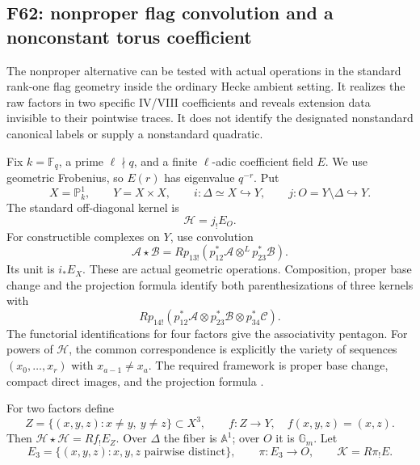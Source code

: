\documentclass[11pt,a4paper]{article}
\newcommand{\fid}[1]{\textsf{#1}}\newcommand{\gate}[1]{\textsf{#1}}
\theoremstyle{named}\newtheorem{finding}{Finding}[section]
\theoremstyle{definition}\newtheorem{definition}[finding]{Definition}
\theoremstyle{remark}\newtheorem{remark}[finding]{Remark}
\begin{document}
\subsection{\fid{F62}: nonproper flag convolution and a nonconstant torus coefficient}
\label{sec:nonpropertorus}

The nonproper alternative can be tested with actual operations in
the standard rank-one flag geometry inside the ordinary Hecke
ambient setting. It realizes the raw factors in two specific
IV/VIII coefficients and reveals extension data invisible to
their pointwise traces. It does not identify the designated
nonstandard canonical labels or supply a nonstandard quadratic.

Fix \(k=\mathbb F_q\), a prime \(\ell\nmid q\), and a finite
\(\ell\)-adic coefficient field \(E\).
We use geometric Frobenius, so \(E(r)\) has eigenvalue \(q^{-r}\).
Put
\[
 X=\mathbb P^1_k,\qquad Y=X\times X,\qquad
 i:\Delta\simeq X\hookrightarrow Y,\qquad
 j:O=Y\setminus\Delta\hookrightarrow Y.
\]
The standard off-diagonal kernel is
\[
                         \mathcal H=j_!E_O.
\]
For constructible complexes on \(Y\), use convolution
\begin{equation}\label{eq:flagkernelconvolution}
 \mathcal A\star\mathcal B
   =Rp_{13!}(p_{12}^*\mathcal A\otimes^L p_{23}^*\mathcal B).
\end{equation}
Its unit is \(i_*E_X\).
These are actual geometric operations. Composition, proper base
change and the projection formula identify both parenthesizations
of three kernels with
\[
 Rp_{14!}(p_{12}^*\mathcal A\otimes
          p_{23}^*\mathcal B\otimes p_{34}^*\mathcal C).
\]
The functorial identifications for four factors give the
associativity pentagon. For powers of \(\mathcal H\), the common
correspondence is explicitly the variety of sequences
\((x_0,\ldots,x_r)\) with \(x_{a-1}\ne x_a\).
The required framework is proper base change, compact direct
images, and the projection formula
\cite[Theorem~17.10, pp.~116--117; Proposition~18.4,
pp.~121--122; Proposition~22.5, pp.~136--137]{Milne}.

For two factors define
\[
 Z=\{(x,y,z):x\ne y,\ y\ne z\}\subset X^3,\qquad
 f:Z\to Y,\quad f(x,y,z)=(x,z).
\]
Then \(\mathcal H\star\mathcal H=Rf_!E_Z\).
Over \(\Delta\) the fiber is \(\mathbb A^1\); over \(O\)
it is \(\mathbb G_m\).
Let
\[
 E_3=\{(x,y,z):x,y,z\text{ pairwise distinct}\},\qquad
 \pi:E_3\to O,\qquad \mathcal K=R\pi_!E.
\]
\end{document}
